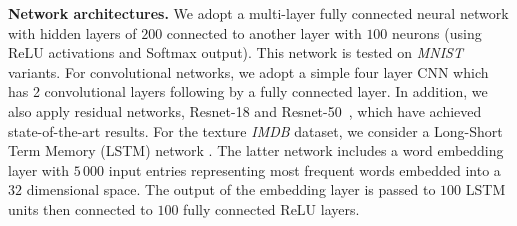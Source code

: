 \documentclass[wcp]{jmlr}
\begin{document}
\textbf{Network architectures.} We adopt a multi-layer fully connected neural network with hidden layers of $200$ connected to another layer with $100$ neurons (using \textrm{ReLU} activations and \textrm{Softmax} output). 
This network is tested on \textit{MNIST} variants.
For convolutional networks, we adopt a simple four layer CNN which has 2 convolutional layers following by a fully connected layer. In addition, we also apply residual networks, Resnet-18 and Resnet-50~\citep{Rnet16}, which have achieved state-of-the-art results.
For the texture \textit{IMDB} dataset, we consider a Long-Short Term Memory (LSTM) network \citep{gers1999learning}.
The latter network includes a word embedding layer with $5\,000$ input entries representing most frequent words embedded into a $32$ dimensional space. 
The output of the embedding layer is passed to $100$ LSTM units then connected to $100$ fully connected \textrm{ReLU} layers. 
\end{document}
